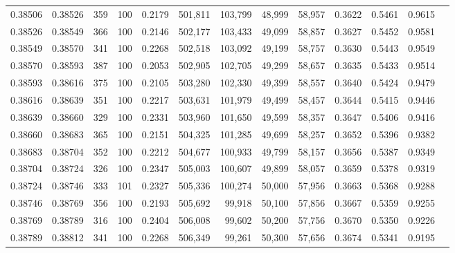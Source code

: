 \begin{tabular}{rrrrrrrrrrrrr}
0.38506 & 0.38526 &    359 & 100 &                                     0.2179 & 501,811 & 103,799 &  48,999 &  58,957 & 0.3622 & 0.5461 & 0.9615 \\
0.38526 & 0.38549 &    366 & 100 &                                     0.2146 & 502,177 & 103,433 &  49,099 &  58,857 & 0.3627 & 0.5452 & 0.9581 \\
0.38549 & 0.38570 &    341 & 100 &                                     0.2268 & 502,518 & 103,092 &  49,199 &  58,757 & 0.3630 & 0.5443 & 0.9549 \\
0.38570 & 0.38593 &    387 & 100 &                                     0.2053 & 502,905 & 102,705 &  49,299 &  58,657 & 0.3635 & 0.5433 & 0.9514 \\
0.38593 & 0.38616 &    375 & 100 &                                     0.2105 & 503,280 & 102,330 &  49,399 &  58,557 & 0.3640 & 0.5424 & 0.9479 \\
0.38616 & 0.38639 &    351 & 100 &                                     0.2217 & 503,631 & 101,979 &  49,499 &  58,457 & 0.3644 & 0.5415 & 0.9446 \\
0.38639 & 0.38660 &    329 & 100 &                                     0.2331 & 503,960 & 101,650 &  49,599 &  58,357 & 0.3647 & 0.5406 & 0.9416 \\
0.38660 & 0.38683 &    365 & 100 &                                     0.2151 & 504,325 & 101,285 &  49,699 &  58,257 & 0.3652 & 0.5396 & 0.9382 \\
0.38683 & 0.38704 &    352 & 100 &                                     0.2212 & 504,677 & 100,933 &  49,799 &  58,157 & 0.3656 & 0.5387 & 0.9349 \\
0.38704 & 0.38724 &    326 & 100 &                                     0.2347 & 505,003 & 100,607 &  49,899 &  58,057 & 0.3659 & 0.5378 & 0.9319 \\
0.38724 & 0.38746 &    333 & 101 &                                     0.2327 & 505,336 & 100,274 &  50,000 &  57,956 & 0.3663 & 0.5368 & 0.9288 \\
0.38746 & 0.38769 &    356 & 100 &                                     0.2193 & 505,692 &  99,918 &  50,100 &  57,856 & 0.3667 & 0.5359 & 0.9255 \\
0.38769 & 0.38789 &    316 & 100 &                                     0.2404 & 506,008 &  99,602 &  50,200 &  57,756 & 0.3670 & 0.5350 & 0.9226 \\
0.38789 & 0.38812 &    341 & 100 &                                     0.2268 & 506,349 &  99,261 &  50,300 &  57,656 & 0.3674 & 0.5341 & 0.9195 \\

\end{tabular}
